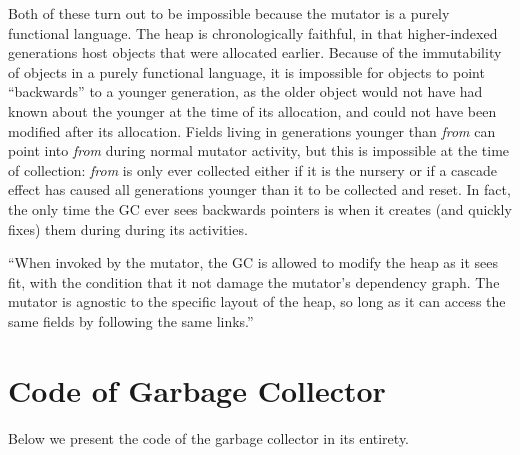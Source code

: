 Both of these turn out to be impossible because the
{\color{magenta}mutator is a purely functional language.}
The heap is chronologically
faithful, in that higher-indexed generations host
objects that were allocated earlier. Because
of the immutability of objects in a purely functional language,
it is impossible for objects to point ``backwards'' to
a younger generation, as the older object would not have
had known about the younger at the time of its allocation, and could not
have been modified after its allocation. Fields living in generations
younger than \emph{from} can point into \emph{from} during
normal mutator activity, but this is
impossible at the time of collection:
\emph{from} is only ever collected either if it is
the nursery or if a cascade effect has caused all generations younger
than it to be collected and reset.
In fact, the only time the GC ever sees backwards pointers
is when it creates (and quickly fixes) them during during its
activities.



``When invoked by the mutator, the GC
is allowed to modify the heap as
it sees fit, with the condition that it not damage the
mutator's dependency graph. The mutator is agnostic
to the specific layout of the heap, so long as
it can access the same fields by following the same
links.''



\section{Code of Garbage Collector}

Below we present the code of the garbage collector in its entirety.



